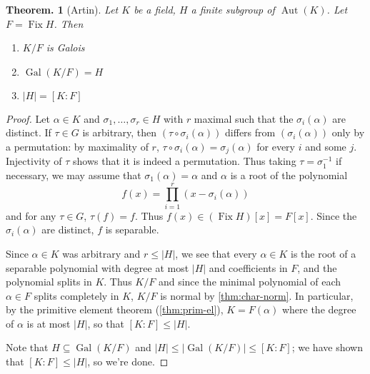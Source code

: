 \documentclass[11pt, a4paper]{memoir}
\theoremstyle{change}
\newtheorem{theorem}{Theorem.}[section]
\theoremstyle{plain}
\theoremstyle{nonumberplain}
\newtheorem{proof}{Proof}
\DeclareMathOperator{\Aut}{Aut}
\DeclareMathOperator{\Fix}{Fix}
\DeclareMathOperator{\Gal}{Gal}
\numberwithin{equation}{section}
\begin{document}
\begin{theorem}[Artin]\label{thm:artin}
    Let $K$ be a field, $H$ a finite subgroup of $\Aut(K)$.
    Let $F=\Fix H$.
    Then
    \begin{enumerate}[nolistsep]
        \item $K/F$ is Galois
        \item $\Gal(K/F)=H$
        \item $|H|=[K:F]$
    \end{enumerate}
\end{theorem}
\begin{proof}
    Let $\alpha\in K$ and $\sigma_1,\ldots,\sigma_r\in H$ with $r$ maximal such that the $\sigma_i(\alpha)$ are distinct.
    If $\tau\in G$ is arbitrary, then $(\tau\circ\sigma_i(\alpha))$ differs from $(\sigma_i(\alpha))$ only by a permutation: by maximality of $r$, $\tau\circ\sigma_i(\alpha)=\sigma_j(\alpha)$ for every $i$ and some $j$.
    Injectivity of $\tau$ shows that it is indeed a permutation.
    Thus taking $\tau=\sigma_1^{-1}$ if necessary, we may assume that $\sigma_1(\alpha)=\alpha$ and $\alpha$ is a root of the polynomial
    \begin{equation*}
        f(x)=\prod_{i=1}^r(x-\sigma_i(\alpha))
    \end{equation*}
    and for any $\tau\in G$, $\tau(f)=f$.
    Thus $f(x)\in (\Fix H)[x]=F[x]$.
    Since the $\sigma_i(\alpha)$ are distinct, $f$ is separable.

    Since $\alpha\in K$ was arbitrary and $r\leq|H|$, we see that every $\alpha\in K$ is the root of a separable polynomial with degree at most $|H|$ and coefficients in $F$, and the polynomial splits in $K$.
    Thus $K/F$ and since the minimal polynomial of each $\alpha\in F$ splits completely in $K$, $K/F$ is normal by \cref{thm:char-norm}.
    In particular, by the primitive element theorem (\cref{thm:prim-el}), $K=F(\alpha)$ where the degree of $\alpha$ is at most $|H|$, so that $[K:F]\leq |H|$.

    Note that $H\subseteq\Gal(K/F)$ and $|H|\leq|\Gal(K/F)|\leq[K:F]$; we have shown that $[K:F]\leq |H|$, so we're done.
\end{proof}
\end{document}
